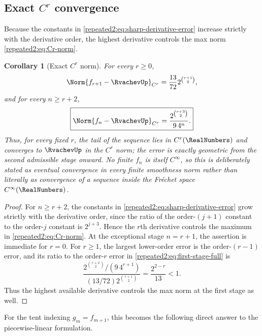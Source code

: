 \documentclass[11pt,oneside]{article}
\newtheorem{corollary}[corollary]{Corollary}
\theoremstyle{definition}
\theoremstyle{remark}
\begin{document}
\subsection{Exact \texorpdfstring{$C^r$}{C-r} convergence}

Because the constants in \eqref{repeated2:eq:sharp-derivative-error} increase strictly with the
derivative order, the highest derivative controls the max norm \eqref{repeated2:eq:Cr-norm}.

\begin{corollary}[Exact $C^r$ norm]
\label{repeated2:cor:exact-Cr-rate}
For every $r\ge0$,
\begin{equation}
 \Norm{f_{r+1}-\RvachevUp}_{C^r}
 =\frac{13}{72}2^{\binom{r+1}{2}},
 \label{repeated2:eq:first-Cr-error}
\end{equation}
and for every $n\ge r+2$,
\begin{equation}
 \boxed{\displaystyle
 \Norm{f_n-\RvachevUp}_{C^r}
 =\frac{2^{\binom{r+3}{2}}}{9\,4^n}.}
 \label{repeated2:eq:exact-Cr-rate}
\end{equation}
Thus, for every fixed $r$, the tail of the sequence lies in $C^r(\RealNumbers)$ and converges to
$\RvachevUp$ in the $C^r$ norm; the error is exactly geometric from the second admissible stage
onward.  No finite $f_n$ is itself $C^\infty$, so this is deliberately stated as eventual
convergence in every finite smoothness norm rather than literally as convergence of a
sequence inside the Fr\'echet space $C^\infty(\RealNumbers)$.
\end{corollary}

\begin{proof}
For $n\ge r+2$, the constants in \eqref{repeated2:eq:sharp-derivative-error} grow strictly with the
derivative order, since the ratio of the order-$(j+1)$ constant to the order-$j$ constant
is $2^{j+3}$.  Hence the $r$th derivative controls the maximum in
\eqref{repeated2:eq:Cr-norm}.  At the exceptional stage $n=r+1$, the assertion is immediate for
$r=0$.  For $r\ge1$, the largest lower-order error is the order-$(r-1)$ error, and its
ratio to the order-$r$ error in \eqref{repeated2:eq:first-stage-full} is
\[
 \frac{2^{\binom{r+2}{2}}/(9\,4^{r+1})}
 {(13/72)2^{\binom{r+1}{2}}}
 =\frac{2^{2-r}}{13}<1.
\]
Thus the highest available derivative controls the max norm at the first stage as well.
\end{proof}

For the tent indexing $g_m=f_{m+1}$, this becomes the following direct answer to the
piecewise-linear formulation.
\end{document}
